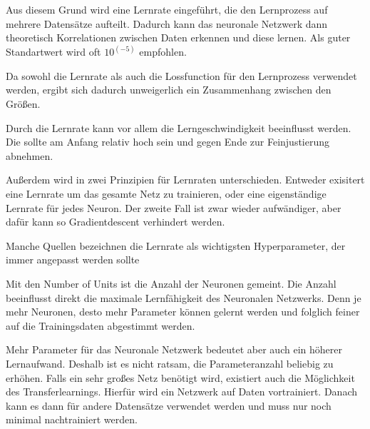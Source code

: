 Aus diesem Grund wird eine Lernrate eingeführt, die den Lernprozess auf mehrere Datensätze aufteilt.
Dadurch kann das neuronale Netzwerk dann theoretisch Korrelationen zwischen Daten erkennen und diese lernen.
Als guter Standartwert wird oft $10^(-5)$ empfohlen. 
\newline

Da sowohl die Lernrate als auch die Lossfunction für den Lernprozess verwendet werden, ergibt sich dadurch unweigerlich ein Zusammenhang zwischen den Größen.
\newline

Durch die Lernrate kann vor allem die Lerngeschwindigkeit beeinflusst werden.
Die sollte am Anfang relativ hoch sein und gegen Ende zur Feinjustierung abnehmen.

Außerdem wird in zwei Prinzipien für Lernraten unterschieden.
Entweder exisitert eine Lernrate um das gesamte Netz zu trainieren, oder eine eigenständige Lernrate für jedes Neuron.
Der zweite Fall ist zwar wieder aufwändiger, aber dafür kann so Gradientdescent verhindert werden.

Manche Quellen bezeichnen die Lernrate als wichtigsten Hyperparameter, der immer angepasst werden sollte \cite{learning-rate-most-important}

Mit den Number of Units ist die Anzahl der Neuronen gemeint.
Die Anzahl beeinflusst direkt die maximale Lernfähigkeit des Neuronalen Netzwerks.
Denn je mehr Neuronen, desto mehr Parameter können gelernt werden und folglich feiner auf die Trainingsdaten abgestimmt werden.
\newline

Mehr Parameter für das Neuronale Netzwerk bedeutet aber auch ein höherer Lernaufwand.
Deshalb ist es nicht ratsam, die Parameteranzahl beliebig zu erhöhen.
Falls ein sehr großes Netz benötigt wird, existiert auch die Möglichkeit des Transferlearnings. 
Hierfür wird ein Netzwerk auf Daten vortrainiert.
Danach kann es dann für andere Datensätze verwendet werden und muss nur noch minimal nachtrainiert werden. 
\newline


